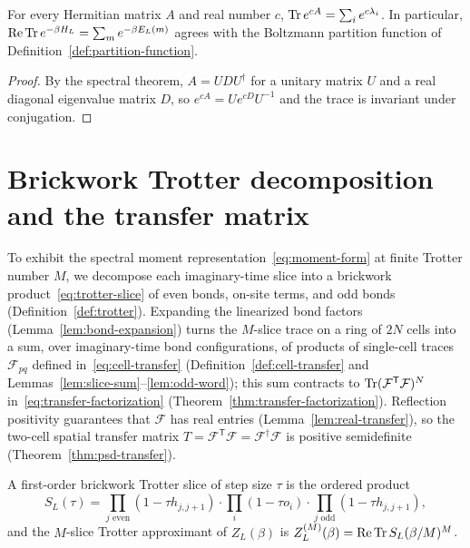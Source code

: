 \begin{lemma}
  \label{lem:ring-trace-exp}
  \leanok
  For every Hermitian matrix \(A\) and real number \(c\), \(\operatorname{Tr} e^{cA} = \sum_i e^{c \lambda_i}\).
  In particular, \(\operatorname{Re}\operatorname{Tr} e^{-\beta H_L} = \sum_m e^{-\beta E_L(m)}\) agrees with the
  Boltzmann partition function of Definition~\ref{def:partition-function}.
\end{lemma}
\begin{proof}
  \leanok
  By the spectral theorem, \(A = U D U^\dagger\) for a unitary matrix \(U\) and a real diagonal
  eigenvalue matrix \(D\), so \(e^{cA} = U e^{cD} U^{-1}\) and the trace is invariant under
  conjugation.
\end{proof}

\section{Brickwork Trotter decomposition and the transfer matrix}

To exhibit the spectral moment representation~\eqref{eq:moment-form} at finite Trotter number \(M\),
we decompose each imaginary-time slice into a brickwork product~\eqref{eq:trotter-slice} of even
bonds, on-site terms, and odd bonds (Definition~\ref{def:trotter}). Expanding the linearized bond
factors (Lemma~\ref{lem:bond-expansion}) turns the \(M\)-slice trace on a ring of \(2N\) cells into
a sum, over imaginary-time bond configurations, of products of single-cell traces
\(\mathcal F_{pq}\) defined in~\eqref{eq:cell-transfer} (Definition~\ref{def:cell-transfer} and
Lemmas~\ref{lem:slice-sum}--\ref{lem:odd-word}); this sum contracts to
\(\operatorname{Tr} (\mathcal F^{\mathsf T} \mathcal F)^N\) in~\eqref{eq:transfer-factorization}
(Theorem~\ref{thm:transfer-factorization}). Reflection positivity guarantees that \(\mathcal F\) has
real entries (Lemma~\ref{lem:real-transfer}), so the two-cell spatial transfer matrix
\(T = \mathcal F^{\mathsf T} \mathcal F = \mathcal F^\dagger \mathcal F\) is positive semidefinite
(Theorem~\ref{thm:psd-transfer}).

\begin{definition}
  \label{def:trotter}
  \leanok
  A first-order brickwork Trotter slice of step size \(\tau\) is the ordered product
  \begin{equation}
    \label{eq:trotter-slice}
    S_L(\tau) = \prod_{j \text{ even}} (1 - \tau h_{j,j+1}) \cdot \prod_i (1 - \tau o_i) \cdot
      \prod_{j \text{ odd}} (1 - \tau h_{j,j+1}),
  \end{equation}
  and the \(M\)-slice Trotter approximant of \(Z_L(\beta)\) is
  \(Z^{(M)}_L(\beta) = \operatorname{Re}\operatorname{Tr} S_L(\beta/M)^M\).
\end{definition}

